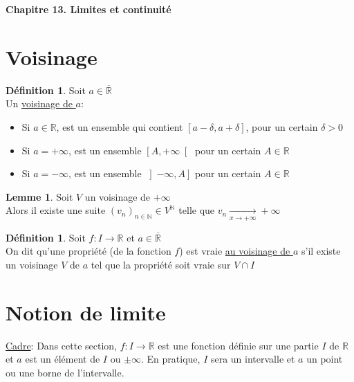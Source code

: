 \documentclass[10pt,a4paper]{article}
\theoremstyle{definition}
\newtheorem{lemme}[proposition]{Lemme}
\newtheorem{definition}[proposition]{Définition}
\begin{document}
\renewcommand{\labelitemi}{$*$}
\renewcommand{\labelenumi}{(\roman{enumi})}
\begin{center}
{\Large \textbf{Chapitre 13. Limites et continuité}}
\end{center}

\section{Voisinage}
\begin{definition}
Soit $a \in\overline{\mathbb{R}}$ \\
Un \uline{voisinage de $a$}:
\begin{itemize}
\item Si $a \in \mathbb{R}$, est un ensemble qui contient $[a - \delta, a + \delta]$, pour un certain $\delta > 0$
\item Si $a = +\infty$, est un ensemble $\left[A, +\infty\right[$ pour un certain $A \in \mathbb{R}$
\item Si $a = -\infty$, est un ensemble $\left]-\infty, A\right]$ pour un certain $A \in \mathbb{R}$
\end{itemize}
\end{definition}
\begin{lemme}
Soit $V$ un voisinage de $+\infty$ \\
Alors il existe une suite $(v_n)_{n \in \mathbb{N}} \in V^{\mathbb{N}}$ telle que $v_n \xrightarrow[x \to +\infty]{} +\infty$ 
\end{lemme}
\begin{definition}
Soit $f: I \to \mathbb{R}$ et $a \in \overline{\mathbb{R}}$ \\
On dit qu'une propriété (de la fonction $f$) est vraie \uline{au voisinage de $a$} s'il existe un voisinage $V$ de $a$ tel que la propriété soit vraie sur $V \cap I$
\end{definition}

\section{Notion de limite}
\uline{Cadre}: Dans cette section, $f: I \to \mathbb{R}$ est une fonction définie sur une partie $I$ de $\mathbb{R}$ et $a$ est un élément de $I$ ou $\pm\infty$. En pratique, $I$ sera un intervalle et $a$ un point ou une borne de l'intervalle.
\end{document}

